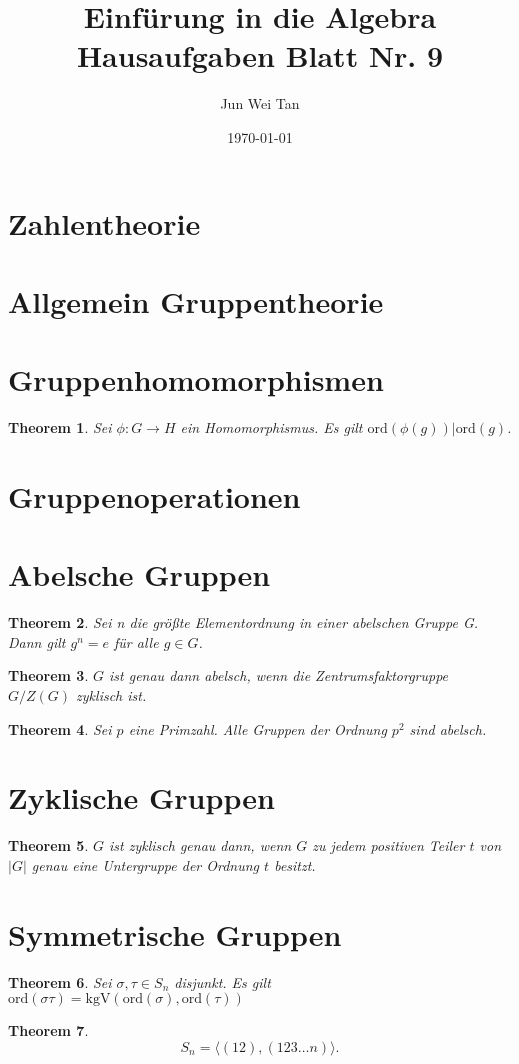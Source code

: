 \documentclass[prb,12pt]{revtex4-2}
\newtheorem{Theorem}{Theorem}
\theoremstyle{definition}
\theoremstyle{definition}
\begin{document}
	\title{Einf\"{u}rung in die Algebra Hausaufgaben Blatt Nr. 9}
	\author{Jun Wei Tan}
	\date{\today}
	\maketitle
	\section{Zahlentheorie}
	\section{Allgemein Gruppentheorie}
	\section{Gruppenhomomorphismen}
	\begin{Theorem}
		Sei $\phi:G\to H$ ein Homomorphismus. Es gilt $\text{ord}(\phi(g))|\text{ord}(g)$.
	\end{Theorem}
	\section{Gruppenoperationen}
	\section{Abelsche Gruppen}
\begin{Theorem}
Sei n die größte Elementordnung in einer abelschen Gruppe G. Dann gilt $g^n = e$ für alle $g \in G$.	
\end{Theorem}
\begin{Theorem}
	$G$ ist genau dann abelsch, wenn die Zentrumsfaktorgruppe $G / Z(G)$ zyklisch ist.
\end{Theorem}
\begin{Theorem}
	Sei $p$ eine Primzahl. Alle Gruppen der Ordnung $p^2$ sind abelsch.
\end{Theorem}
	\section{Zyklische Gruppen}
	\begin{Theorem}
		$G$ ist zyklisch genau dann, wenn $G$ zu jedem positiven Teiler $t$ von $|G|$ genau eine Untergruppe der Ordnung $t$ besitzt.
	\end{Theorem}
	\section{Symmetrische Gruppen}
	\begin{Theorem}
		Sei $\sigma, \tau\in S_n$ disjunkt. Es gilt $\text{ord}(\sigma\tau)=\text{kgV}(\text{ord}(\sigma),\text{ord}(\tau))$
	\end{Theorem}
	\begin{Theorem}
		\[
		S_n=\langle (12),(123\dots n)\rangle
		.\] 
	\end{Theorem}
\end{document}
